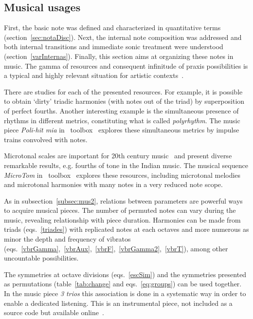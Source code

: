 \subsection{Musical usages}\label{subsec:usosmusicais3}

First, the basic note was defined and characterized in quantitative terms (section~\ref{sec:notaDisc}).
Next, the internal note
composition was addressed and both internal transitions and immediate sonic treatment
were understood (section~\ref{varInternas}). Finally, this section aims at organizing these notes in music. The gamma of resources and consequent infinitude
of praxis possibilities is a typical and highly relevant situation for artistic contexts~\cite{Harmonia,Webern}.

There are studies for each of the presented resources.
For example, it is possible to obtain `dirty' triadic harmonies (with notes out of the triad) by superposition of perfect fourths. 
Another interesting example is the simultaneous
presence of rhythms in different metrics, constituting what is
called \emph{polyrhythm}. The music piece \emph{Poli-hit mia} in \massa\ toolbox~\cite{MASSA} explores these simultaneous metrics by impulse trains convolved with notes.

Microtonal scales are important for 20th
century music~\cite{microtonalidade} and present diverse remarkable results, e.g.
fourths of tone in the Indian music. The musical sequence \emph{MicroTom} in \massa\ toolbox~\cite{MASSA} explores these resources, including microtonal melodies and microtonal harmonies
with many notes in a very reduced note scope. 

As in subsection~\ref{subsec:mus2}, relations between
parameters are powerful ways to acquire musical pieces.
The number of permuted
notes can vary during the music, revealing relationship with piece
duration. Harmonies can be made from triads (eqs.~\ref{triades}) with replicated
notes at each octaves and more numerous as minor the depth and frequency of
vibratos (eqs.~\ref{vbrGamma},~\ref{vbrAux},~\ref{vbrF},~\ref{vbrGamma2},~\ref{vbrT}),
among other uncountable possibilities.

The symmetries at octave divisions (eqs.~\ref{escSim}) and the
symmetries presented as permutations (table~\ref{tab:change} and
eqs.~\ref{eq:groups}) can be used together. In the music piece \emph{3 trios}
this association is done in a systematic way in order to enable a dedicated
listening. This is an instrumental piece, not included as a source
code but available online~\cite{3Trios}. 

